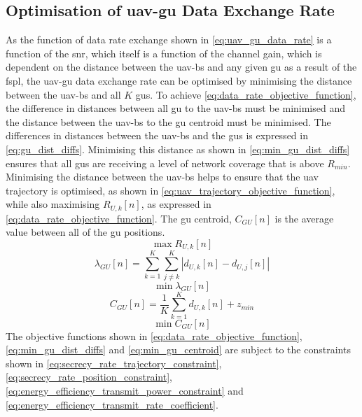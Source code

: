 \subsection{Optimisation of \texorpdfstring{\acrshort{uav}-\acrshort{gu}}{UAV-GU} Data Exchange Rate}
As the function of data rate exchange shown in \ref{eq:uav_gu_data_rate} is a function of the \acrshort{snr}, which itself is a function of the channel gain, which is dependent on the distance between the \acrshort{uav}-\acrshort{bs} and any given \acrshort{gu} as a result of the \acrshort{fspl}, the \acrshort{uav}-\acrshort{gu} data exchange rate can be optimised by minimising the distance between the \acrshort{uav}-\acrshort{bs} and all $K$ \acrshort{gu}s. 
To achieve \ref{eq:data_rate_objective_function}, the difference in distances between all \acrshort{gu} to the \acrshort{uav}-\acrshort{bs} must be minimised and the distance between the \acrshort{uav}-\acrshort{bs} to the \acrshort{gu} centroid must be minimised. 
The differences in distances between the \acrshort{uav}-\acrshort{bs} and the \acrshort{gu}s is expressed in \ref{eq:gu_dist_diffs}. 
Minimising this distance as shown in \ref{eq:min_gu_dist_diffs} ensures that all \acrshort{gu}s are receiving a level of network coverage that is above $R_{min}$.
Minimising the distance between the \acrshort{uav}-\acrshort{bs} helps to ensure that the \acrshort{uav} trajectory is optimised, as shown in \ref{eq:uav_trajectory_objective_function}, while also maximising $R_{U, k} [n]$, as expressed in \ref{eq:data_rate_objective_function}. 
The \acrshort{gu} centroid, $C_{GU} [n]$ is the average value between all of the \acrshort{gu} positions. 
\begin{equation} \label{eq:data_rate_objective_function}
    \max R_{U, k} [n]
\end{equation}
\begin{equation} \label{eq:gu_dist_diffs}
    \lambda_{GU} [n] = \sum_{k=1}^{K} \sum_{j \neq k}^{K} |d_{U, k} [n] - d_{U, j}[n]|
\end{equation}
\begin{equation} \label{eq:min_gu_dist_diffs}
    \min \lambda_{GU} [n]
\end{equation}
\begin{equation} \label{eq:gu_centroid}
    C_{GU} [n] = \frac{1}{K} \sum_{k=1}^{K} d_{U, k} [n] + z_{min}
\end{equation}
\begin{equation} \label{eq:min_gu_centroid}
    \min C_{GU} [n]
\end{equation}
The objective functions shown in \ref{eq:data_rate_objective_function}, \ref{eq:min_gu_dist_diffs} and \ref{eq:min_gu_centroid} are subject to the constraints shown in \ref{eq:secrecy_rate_trajectory_constraint}, \ref{eq:secrecy_rate_position_constraint}, \ref{eq:energy_efficiency_transmit_power_constraint} and \ref{eq:energy_efficiency_transmit_rate_coefficient}.  

